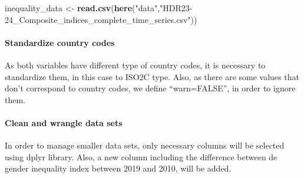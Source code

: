 \documentclass[
]{article}
\newenvironment{Shaded}{\begin{snugshade}}{\end{snugshade}}
\newcommand{\AttributeTok}[1]{\textcolor[rgb]{0.13,0.29,0.53}{#1}}
\newcommand{\FunctionTok}[1]{\textcolor[rgb]{0.13,0.29,0.53}{\textbf{#1}}}
\newcommand{\NormalTok}[1]{#1}
\newcommand{\OtherTok}[1]{\textcolor[rgb]{0.56,0.35,0.01}{#1}}
\newcommand{\SpecialCharTok}[1]{\textcolor[rgb]{0.81,0.36,0.00}{\textbf{#1}}}
\newcommand{\StringTok}[1]{\textcolor[rgb]{0.31,0.60,0.02}{#1}}
\begin{document}
\begin{Shaded}
\begin{Highlighting}[]
\NormalTok{inequality\_data }\OtherTok{\textless{}{-}} \FunctionTok{read.csv}\NormalTok{(}\FunctionTok{here}\NormalTok{(}\StringTok{"data"}\NormalTok{,}\StringTok{"HDR23{-}24\_Composite\_indices\_complete\_time\_series.csv"}\NormalTok{))}
\end{Highlighting}
\end{Shaded}

\paragraph{Standardize country codes}\label{standardize-country-codes}

As both variables have different type of country codes, it is necessary
to standardize them, in this case to ISO2C type. Also, as there are some
values that don't correspond to country codes, we define ``warn=FALSE'',
in order to ignore them.

\begin{Shaded}
\end{Shaded}

\paragraph{Clean and wrangle data
sets}\label{clean-and-wrangle-data-sets}

In order to manage smaller data sets, only necessary columns will be
selected using dplyr library. Also, a new column including the
difference between de gender inequality index between 2019 and 2010,
will be added.
\end{document}
